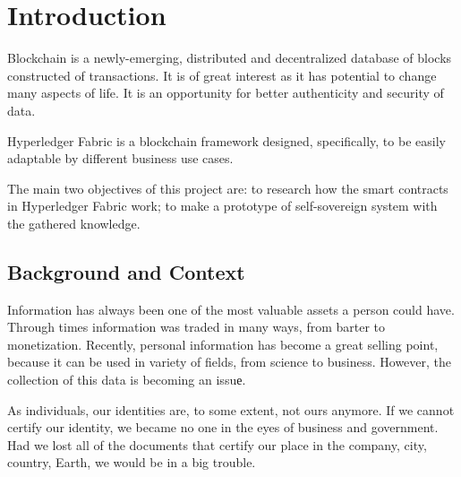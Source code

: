 \documentclass[a4paper,11pt]{report}
\begin{document}

\tableofcontents

\listoffigures                


\clearpage


\setcounter{page}{1}



\chapter{Introduction}

\label{introduction}

Blockchain is a newly-emerging, distributed and decentralized database of blocks constructed of transactions. It is of great interest as it has potential to change many aspects of life. It is an opportunity for better authenticity and security of data. 

Hyperledger Fabric is a blockchain framework designed, specifically, to be easily adaptable by different business use cases. 

The main two objectives of this project are: to research how the smart contracts in Hyperledger Fabric work; to make a prototype of self-sovereign system with the gathered knowledge. 

\section{Background and Context}

\label{introduction-background}

Information has always been one of the most valuable assets a person could have. Through times information was traded in many ways, from barter to monetization. Recently, personal information has become a great selling point, because it can be used in variety of fields, from science to business. However, the collection of this data is becoming an issuе.

	As individuals, our identities are, to some extent, not ours anymore. If we cannot certify our identity, we became no one in the eyes of business and government. Had we lost all of the documents that certify our place in the company, city, country, Earth, we would be in a big trouble. \cite{allen2016path}
	
\end{document}
